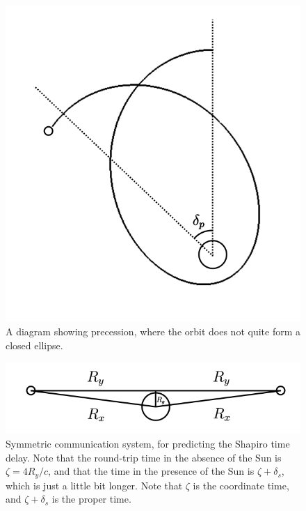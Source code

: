 \documentclass[12pt]{article}
\begin{document}
\begin{figure} 
\centering
\label{fig2}
  \includegraphics[width = 6 in]{precession.png}
  \caption{ A diagram showing precession, where the orbit does not quite form a closed ellipse.
}
\end{figure}



\begin{figure} 
\centering
\label{fig3}
  \includegraphics[width = 6 in]{comm.png}
  \caption{ Symmetric communication system, for predicting the Shapiro time delay.
Note that the round-trip time in the absence of the Sun is $\zeta = 4 R_y / c$, and that the time in the presence of the Sun is $\zeta + \delta_{s}$, which is just a little bit longer.
Note that $\zeta$ is the coordinate time, and $\zeta + \delta_{s}$ is the proper time.
}
\end{figure}
\end{document}
